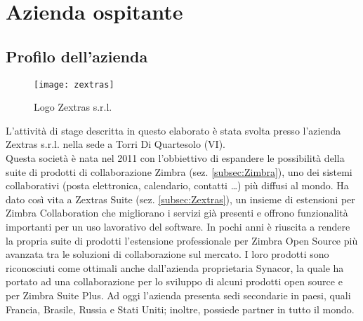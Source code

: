 \chapter{Azienda ospitante}\label{chap:company}

\section{Profilo dell'azienda}
\begin{figure}[H] 
	\centering
	\texttt{[image: zextras]}
	\caption{Logo Zextras s.r.l.}
	\label{fig:logoZextras}
\end{figure}
L'attività di stage descritta in questo elaborato è stata svolta presso l'azienda Zextras s.r.l. nella sede a Torri Di Quartesolo (VI). \\
Questa società è nata nel 2011 con l'obbiettivo di espandere le possibilità della suite di prodotti di collaborazione Zimbra (sez. \ref{subsec:Zimbra}), uno dei sistemi collaborativi (posta elettronica, calendario, contatti …) più diffusi al mondo. Ha dato così vita a Zextras Suite (sez. \ref{subsec:Zextras}), un insieme di estensioni per Zimbra Collaboration che migliorano i servizi già presenti e offrono funzionalità importanti per un uso lavorativo del software.
In pochi anni è riuscita a rendere la propria suite di prodotti l'estensione professionale per Zimbra Open Source più avanzata tra le soluzioni di collaborazione sul mercato. I loro prodotti sono riconosciuti come ottimali anche dall'azienda proprietaria Synacor, la quale ha portato ad una collaborazione per lo sviluppo di alcuni prodotti open source e per Zimbra Suite Plus.
Ad oggi l'azienda presenta sedi secondarie in paesi, quali Francia, Brasile, Russia e Stati Uniti;  inoltre, possiede partner in tutto il mondo.\\



